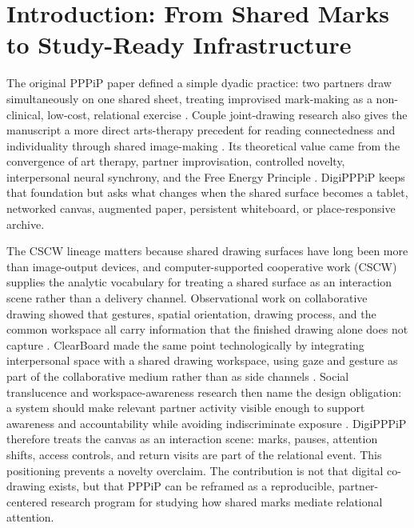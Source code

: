 \documentclass[
  english,
]{article}
\begin{document}
\newpage

\section{Introduction: From Shared Marks to Study-Ready
Infrastructure}\label{sec:introduction}

The original PPPiP paper defined a simple dyadic practice: two partners
draw simultaneously on one shared sheet, treating improvised mark-making
as a non-clinical, low-cost, relational exercise
\citep{mikhailova2018pppip}. Couple joint-drawing research also gives
the manuscript a more direct arts-therapy precedent for reading
connectedness and individuality through shared image-making
\citep{snir2013joint}. Its theoretical value came from the convergence
of art therapy, partner improvisation, controlled novelty, interpersonal
neural synchrony, and the Free Energy Principle \citep{friston2010fep}.
DigiPPPiP keeps that foundation but asks what changes when the shared
surface becomes a tablet, networked canvas, augmented paper, persistent
whiteboard, or place-responsive archive.

The CSCW lineage matters because shared drawing surfaces have long been
more than image-output devices, and computer-supported cooperative work
(CSCW) supplies the analytic vocabulary for treating a shared surface as
an interaction scene rather than a delivery channel. Observational work
on collaborative drawing showed that gestures, spatial orientation,
drawing process, and the common workspace all carry information that the
finished drawing alone does not capture
\citep{tang1991collaborativework}. ClearBoard made the same point
technologically by integrating interpersonal space with a shared drawing
workspace, using gaze and gesture as part of the collaborative medium
rather than as side channels \citep{ishii1993clearboard}. Social
translucence and workspace-awareness research then name the design
obligation: a system should make relevant partner activity visible
enough to support awareness and accountability while avoiding
indiscriminate exposure
\citep{erickson2000socialtranslucence, gutwin2002workspaceawareness}.
DigiPPPiP therefore treats the canvas as an interaction scene: marks,
pauses, attention shifts, access controls, and return visits are part of
the relational event. This positioning prevents a novelty overclaim. The
contribution is not that digital co-drawing exists, but that PPPiP can
be reframed as a reproducible, partner-centered research program for
studying how shared marks mediate relational attention.
\end{document}
